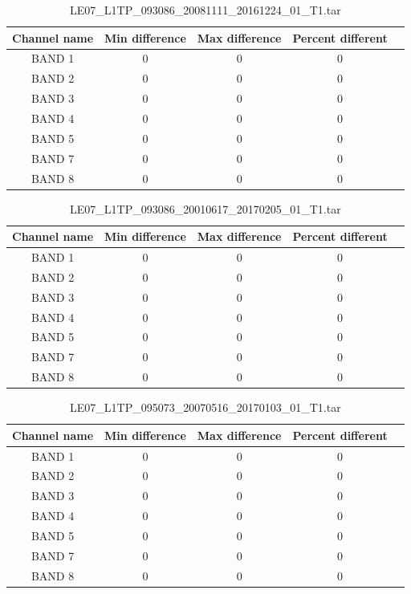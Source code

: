 \documentclass[a4paper]{article}
\begin{document}
  \clearpage

    \begin{table}[ht!]
      \caption{LE07\_L1TP\_093086\_20081111\_20161224\_01\_T1.tar}\label{table:7}
      \centering
      \small
      \begin{tabular}{ccccc} \midrule
        \textbf{Channel name} & \textbf{Min difference} & \textbf{Max difference} & \textbf{Percent different} \\ \midrule
        BAND 1 & 0 & 0 & 0 \\
        BAND 2 & 0 & 0 & 0 \\
        BAND 3 & 0 & 0 & 0 \\
        BAND 4 & 0 & 0 & 0 \\
        BAND 5 & 0 & 0 & 0 \\
        BAND 7 & 0 & 0 & 0 \\
        BAND 8 & 0 & 0 & 0 \\ \midrule
      \end{tabular}
    \end{table}

    \begin{table}[ht!]
      \caption{LE07\_L1TP\_093086\_20010617\_20170205\_01\_T1.tar}\label{table:8}
      \centering
      \small
      \begin{tabular}{ccccc} \midrule
        \textbf{Channel name} & \textbf{Min difference} & \textbf{Max difference} & \textbf{Percent different} \\ \midrule
        BAND 1 & 0 & 0 & 0 \\
        BAND 2 & 0 & 0 & 0 \\
        BAND 3 & 0 & 0 & 0 \\
        BAND 4 & 0 & 0 & 0 \\
        BAND 5 & 0 & 0 & 0 \\
        BAND 7 & 0 & 0 & 0 \\
        BAND 8 & 0 & 0 & 0 \\ \midrule
      \end{tabular}
    \end{table}

    \begin{table}[ht!]
      \caption{LE07\_L1TP\_095073\_20070516\_20170103\_01\_T1.tar}\label{table:9}
      \centering
      \small
      \begin{tabular}{ccccc} \midrule
        \textbf{Channel name} & \textbf{Min difference} & \textbf{Max difference} & \textbf{Percent different} \\ \midrule
        BAND 1 & 0 & 0 & 0 \\
        BAND 2 & 0 & 0 & 0 \\
        BAND 3 & 0 & 0 & 0 \\
        BAND 4 & 0 & 0 & 0 \\
        BAND 5 & 0 & 0 & 0 \\
        BAND 7 & 0 & 0 & 0 \\
        BAND 8 & 0 & 0 & 0 \\ \midrule
      \end{tabular}
    \end{table}
\end{document}
